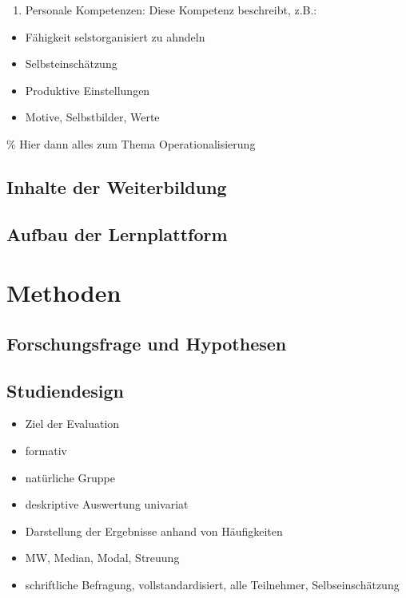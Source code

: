 \documentclass[12pt, bibliography=totoc]{scrartcl}
\begin{document}
\begin{enumerate}
\def\labelenumi{\arabic{enumi}.}
\tightlist
\item
  Personale Kompetenzen: Diese Kompetenz beschreibt, z.B.:
\end{enumerate}

\begin{itemize}
\item
  Fähigkeit selstorganisiert zu ahndeln
\item
  Selbsteinschätzung
\item
  Produktive Einstellungen
\item
  Motive, Selbstbilder, Werte
\end{itemize}

\% Hier dann alles zum Thema Operationalisierung

\subsection{Inhalte der Weiterbildung}\label{inhalte-der-weiterbildung}

\subsection{Aufbau der Lernplattform}\label{aufbau-der-lernplattform}

\section{Methoden}\label{methoden}

\subsection{Forschungsfrage und
Hypothesen}\label{forschungsfrage-und-hypothesen}

\subsection{Studiendesign}\label{studiendesign}

\begin{itemize}
\tightlist
\item
  Ziel der Evaluation
\item
  formativ
\item
  natürliche Gruppe
\item
  deskriptive Auswertung univariat
\item
  Darstellung der Ergebnisse anhand von Häufigkeiten
\item
  MW, Median, Modal, Streuung
\item
  schriftliche Befragung, vollstandardisiert, alle Teilnehmer,
  Selbseinschätzung
\end{itemize}
\end{document}
